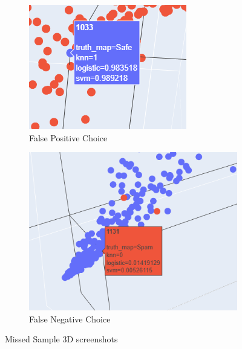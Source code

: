 \documentclass[12pt]{article}
\begin{document}
\begin{figure}
  \begin{subfigure}{.5\textwidth}
  \includegraphics[width=.95\textwidth]{../results/False_Positive.png}
    \caption{False Positive Choice}
    \end{subfigure}%
  \begin{subfigure}{.5\textwidth}
    \includegraphics[width=.95\textwidth]{../results/False_Negative.png}
    \caption{False Negative Choice}
  \end{subfigure}
  \caption{Missed Sample 3D screenshots}
  \label{figure3}
\end{figure}
\end{document}
